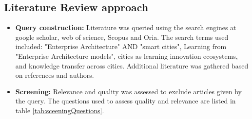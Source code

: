 \subsection{Literature Review approach}

\iffalse \fi
\begin{itemize}
    \item \textbf{Query construction:} Literature was queried using the search engines at google scholar, web of science, Scopus and Oria. The search terms used included: "Enterprise Architecture" AND "smart cities", Learning from "Enterprise Architecture models", cities as learning innovation ecosystems, and knowledge transfer across cities. Additional literature was gathered based on references and authors.
    
    \item \textbf{Screening:} Relevance and quality was assessed to exclude articles given by the query. The questions used to assess quality and relevance are listed in table \ref{tab:sceeningQuestions}. \iffalse and the result of the query and screening is displayed in figure \ref{fig:screening}. \fi
    
\end{itemize}

